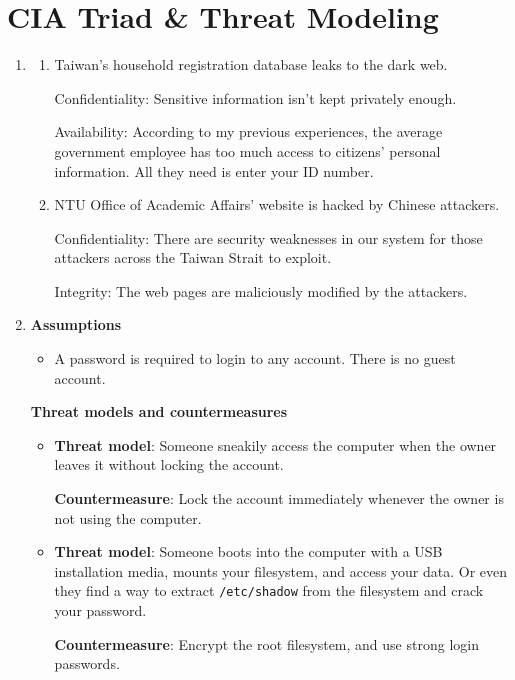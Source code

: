 \documentclass[12pt, a4paper]{article}
\begin{document}
  \section{CIA Triad \& Threat Modeling}
  \begin{enumerate}[label=(\alph*)]
    \item
    \begin{enumerate}[label=(\arabic*)]
      \item Taiwan's household registration database leaks to the dark web.

      Confidentiality: Sensitive information isn't kept privately enough.

      Availability: According to my previous experiences, the average government
      employee has too much access to citizens' personal information. All they need is
      enter your ID number.

      \item NTU Office of Academic Affairs' website is hacked by Chinese attackers.

      Confidentiality: There are security weaknesses in our system
      for those attackers across the Taiwan Strait to exploit.

      Integrity: The web pages are maliciously modified by the attackers.
    \end{enumerate}
    \item \textbf{Assumptions}
    \begin{itemize}
      \item A password is required to login to any account. There is no guest account.
    \end{itemize}

    \textbf{Threat models and countermeasures}
    \begin{itemize}
      \item \textbf{Threat model}: Someone sneakily access the computer when the owner leaves
      it without locking the account.

      \textbf{Countermeasure}: Lock the account immediately whenever the owner is not using
      the computer.

      \item \textbf{Threat model}: Someone boots into the computer with a USB installation media,
      mounts your filesystem, and access your data.
      Or even they find a way to extract \verb|/etc/shadow| from the filesystem and crack your password.

      \textbf{Countermeasure}: Encrypt the root filesystem, and use strong login passwords.
    \end{itemize}


\end{enumerate}
\end{document}
